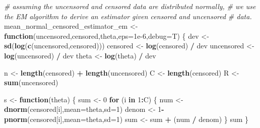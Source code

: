 \documentclass[
]{article}
\newenvironment{Shaded}{\begin{snugshade}}{\end{snugshade}}
\newcommand{\AttributeTok}[1]{\textcolor[rgb]{0.13,0.29,0.53}{#1}}
\newcommand{\CommentTok}[1]{\textcolor[rgb]{0.56,0.35,0.01}{\textit{#1}}}
\newcommand{\ControlFlowTok}[1]{\textcolor[rgb]{0.13,0.29,0.53}{\textbf{#1}}}
\newcommand{\DecValTok}[1]{\textcolor[rgb]{0.00,0.00,0.81}{#1}}
\newcommand{\FloatTok}[1]{\textcolor[rgb]{0.00,0.00,0.81}{#1}}
\newcommand{\FunctionTok}[1]{\textcolor[rgb]{0.13,0.29,0.53}{\textbf{#1}}}
\newcommand{\NormalTok}[1]{#1}
\newcommand{\OtherTok}[1]{\textcolor[rgb]{0.56,0.35,0.01}{#1}}
\newcommand{\SpecialCharTok}[1]{\textcolor[rgb]{0.81,0.36,0.00}{\textbf{#1}}}
\begin{document}
\begin{Shaded}
\begin{Highlighting}[]
\CommentTok{\# assuming the uncensored and censored data are distributed normally,}
\CommentTok{\# we use the EM algorithm to derive an estimator given censored and uncensored}
\CommentTok{\# data.}
\NormalTok{mean\_normal\_censored\_estimator\_em }\OtherTok{\textless{}{-}} \ControlFlowTok{function}\NormalTok{(uncensored,censored,theta,}\AttributeTok{eps=}\FloatTok{1e{-}6}\NormalTok{,}\AttributeTok{debug=}\NormalTok{T)}
\NormalTok{\{}
\NormalTok{  dev }\OtherTok{\textless{}{-}} \FunctionTok{sd}\NormalTok{(}\FunctionTok{log}\NormalTok{(}\FunctionTok{c}\NormalTok{(uncensored,censored)))}
\NormalTok{  censored }\OtherTok{\textless{}{-}} \FunctionTok{log}\NormalTok{(censored) }\SpecialCharTok{/}\NormalTok{ dev}
\NormalTok{  uncensored }\OtherTok{\textless{}{-}} \FunctionTok{log}\NormalTok{(uncensored) }\SpecialCharTok{/}\NormalTok{ dev}
\NormalTok{  theta }\OtherTok{\textless{}{-}} \FunctionTok{log}\NormalTok{(theta) }\SpecialCharTok{/}\NormalTok{ dev}
  
\NormalTok{  n }\OtherTok{\textless{}{-}} \FunctionTok{length}\NormalTok{(censored) }\SpecialCharTok{+} \FunctionTok{length}\NormalTok{(uncensored)}
\NormalTok{  C }\OtherTok{\textless{}{-}} \FunctionTok{length}\NormalTok{(censored)}
\NormalTok{  R }\OtherTok{\textless{}{-}} \FunctionTok{sum}\NormalTok{(uncensored)}
  
\NormalTok{  s }\OtherTok{\textless{}{-}} \ControlFlowTok{function}\NormalTok{(theta)}
\NormalTok{  \{}
\NormalTok{    sum }\OtherTok{\textless{}{-}} \DecValTok{0}
    \ControlFlowTok{for}\NormalTok{ (i }\ControlFlowTok{in} \DecValTok{1}\SpecialCharTok{:}\NormalTok{C)}
\NormalTok{    \{}
\NormalTok{      num }\OtherTok{\textless{}{-}} \FunctionTok{dnorm}\NormalTok{(censored[i],}\AttributeTok{mean=}\NormalTok{theta,}\AttributeTok{sd=}\DecValTok{1}\NormalTok{)}
\NormalTok{      denom }\OtherTok{\textless{}{-}} \DecValTok{1}\SpecialCharTok{{-}}\FunctionTok{pnorm}\NormalTok{(censored[i],}\AttributeTok{mean=}\NormalTok{theta,}\AttributeTok{sd=}\DecValTok{1}\NormalTok{)}
\NormalTok{      sum }\OtherTok{\textless{}{-}}\NormalTok{ sum }\SpecialCharTok{+}\NormalTok{ (num }\SpecialCharTok{/}\NormalTok{ denom)}
\NormalTok{    \}}
\NormalTok{    sum}
\NormalTok{  \}}
  

\end{Highlighting}
\end{Shaded}
\end{document}

